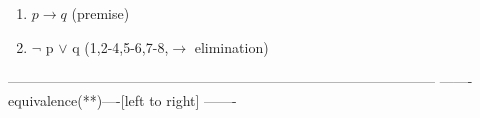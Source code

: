 \documentclass[a4paper,12pt]{article}
\newcommand\tab[1][1cm]{\hspace*{#1}}
\begin{document}
\begin{tcolorbox}
\begin{center}
\end{center}
\begin{enumerate}
    \item $p \rightarrow q$ \tab (premise)
    \item $\neg$ p $\vee$ q \tab (1,2-4,5-6,7-8,$\rightarrow$ elimination)
\end{enumerate}
\begin{center}
--------------------------------------------------------------------------------------------\newline
------- equivalence(**)----[left to right] -------
\end{center}


\end{tcolorbox}
\end{document}
